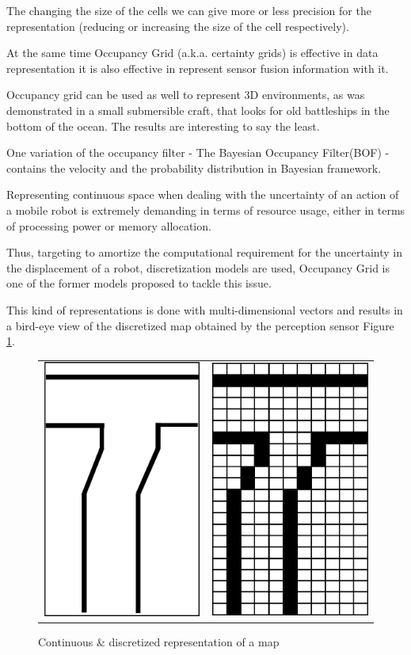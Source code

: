 The changing the size of the cells we can give more or less precision for the representation (reducing or increasing the size of the cell respectively).

At the same time Occupancy Grid (a.k.a. certainty grids) is effective in data representation it is also effective in represent sensor fusion information with it. 

Occupancy grid can be used as well to represent 3D environments, as was demonstrated in a small submersible craft, that looks for old battleships in the bottom of the ocean\cite{DBLP:journals/aim/Moravec88}. The results are interesting to say the least.

One variation of the occupancy filter - The Bayesian Occupancy Filter(BOF) - contains the velocity and the probability distribution in Bayesian framework.

Representing continuous space when dealing with the uncertainty of an action of a mobile robot is extremely demanding in terms of resource usage, either in terms of processing power or memory allocation.

Thus, targeting to amortize the computational requirement for the uncertainty in the displacement of a robot, discretization models are used, Occupancy Grid\cite{Elfes:1989:UOG:68491.68495} is one of the former models proposed to tackle this issue.

This kind of representations is done with multi-dimensional vectors and results in a bird-eye view of the discretized map obtained by the perception sensor Figure \ref{fig:grid:continuous:discretized}.

\begin{figure}[h]
\centering
	\begin{tabular}{lr}\\
		\includegraphics[width=0.25\columnwidth]{img/fig:grid:continuous} &
		\includegraphics[width=0.25\columnwidth]{img/fig:grid:discretized}
	\end{tabular}
	\caption{Continuous \& discretized representation of a map}
	\label{fig:grid:continuous:discretized}
\end{figure}

